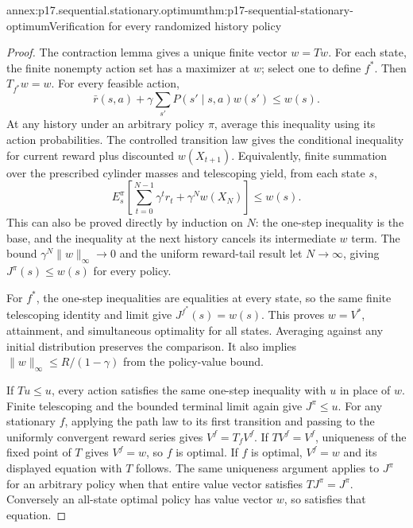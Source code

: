 \begin{annexitem}{annex:p17.sequential.stationary.optimum}{thm:p17-sequential-stationary-optimum}{Verification for every randomized history policy}
\begin{proof}
The contraction lemma gives a unique finite vector \(w=Tw\).
For each state, the finite nonempty action set has a
maximizer at \(w\); select one to define \(f^*\).
Then \(T_{f^*}w=w\).
For every feasible action,
\[
               \bar r(s,a)+\gamma\sum_{s'}P(s'\mid s,a)w(s')
                                                        \leq w(s).
\]
At any history under an arbitrary policy \(\pi\),
average this inequality using its action probabilities.
The controlled transition law gives the conditional
inequality for current reward plus discounted \(w(X_{t+1})\).
Equivalently, finite summation over the prescribed
cylinder masses and telescoping yield, from each state \(s\),
\[
 E_s^\pi\left[\sum_{t=0}^{N-1}\gamma^t r_t
                              +\gamma^Nw(X_N)\right]\leq w(s).
\]
This can also be proved directly by induction on \(N\):
the one-step inequality is the base, and the inequality
at the next history cancels its intermediate \(w\) term.
The bound \(\gamma^N\|w\|_\infty\to0\)
and the uniform reward-tail result let \(N\to\infty\),
giving \(J^\pi(s)\leq w(s)\) for every policy.

For \(f^*\), the one-step inequalities are equalities
at every state, so the same finite telescoping identity
and limit give \(J^{f^*}(s)=w(s)\).
This proves \(w=V^*\), attainment, and simultaneous
optimality for all states. Averaging against any
initial distribution preserves the comparison.
It also implies \(\|w\|_\infty\leq R/(1-\gamma)\)
from the policy-value bound.

If \(Tu\leq u\), every action satisfies the same
one-step inequality with \(u\) in place of \(w\).
Finite telescoping and the bounded terminal limit
again give \(J^\pi\leq u\).
For any stationary \(f\), applying the path law
to its first transition and passing to the uniformly
convergent reward series gives \(V^f=T_fV^f\).
If \(TV^f=V^f\), uniqueness of the fixed point of
\(T\) gives \(V^f=w\), so \(f\) is optimal.
If \(f\) is optimal, \(V^f=w\) and its displayed
equation with \(T\) follows.
The same uniqueness argument applies to \(J^\pi\)
for an arbitrary policy when that entire value
vector satisfies \(TJ^\pi=J^\pi\).
Conversely an all-state optimal policy has value
vector \(w\), so satisfies that equation.
\end{proof}
\end{annexitem}

